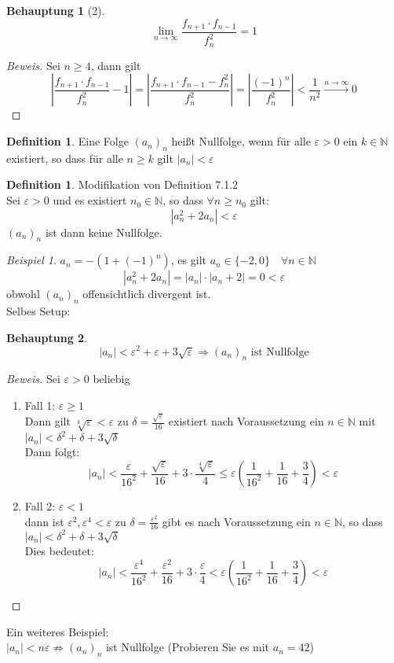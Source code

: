\documentclass[12pt,a4paper,titlepage]{article} %
\theoremstyle{definition}
\newtheorem{defi}[satz]{Definition}
\newtheorem*{beh}{Behauptung}
\theoremstyle{remark}
\newtheorem*{bsp}{Beispiel}
\newenvironment{bew}{\begin{proof}[Beweis]}{\end{proof}}
\newcommand{\N}{\mathbb{N}}
\newcommand{\limes}[1]{\lim\limits_{#1\rightarrow\infty}}
\begin{document}
	\begin{beh}[2]
		\[\limes{n} \frac{f_{n+1} \cdot f_{n-1}}{f_n^2} = 1\]
	\end{beh}
	\begin{bew}
		Sei \(n \geq 4\), dann gilt
		\[\left|\frac{f_{n+1} \cdot f_{n-1}}{f_n^2} - 1\right| = \left|\frac{f_{n+1} \cdot f_{n-1} - f_n^2}{f_n^2}\right| = \left|\frac{(-1)^n}{f_n^2}\right| < \frac{1}{n^2} \overset{n \rightarrow \infty}{\rightarrow} 0\]
	\end{bew}
	\begin{defi}
		Eine Folge \((a_n)_n\) heißt Nullfolge, wenn für alle \(\varepsilon > 0\) ein \(k \in \N\) existiert, so dass für alle \(n \geq k\) gilt \(|a_n| < \varepsilon\)
	\end{defi}
	\begin{defi}
		Modifikation von Definition 7.1.2\\
		Sei \(\varepsilon > 0\) und es existiert \(n_0 \in \N\), so dass \(\forall n \geq n_0\) gilt:
		\[|a_n^2 + 2a_n| < \varepsilon\]
		\((a_n)_n\) ist dann keine Nullfolge.
	\end{defi}
	\begin{bsp}
		\(a_n = -(1 + (-1)^n)\), es gilt \(a_n \in \{-2, 0\} \quad \forall n \in \N\)
		\[|a_n^2 + 2a_n| = |a_n| \cdot |a_n + 2| = 0 < \varepsilon\]
		obwohl \((a_n)_n\) offensichtlich divergent ist.\\
		Selbes Setup:
		\begin{beh}
			\[|a_n| < \varepsilon^2 + \varepsilon + 3\sqrt{\varepsilon} \Rightarrow (a_n)_n \text{ ist Nullfolge}\]
		\end{beh}
		\begin{bew}
			Sei \(\varepsilon > 0\) beliebig\\
			\begin{enumerate}
				\item Fall 1: \(\varepsilon \geq 1\)\\
					Dann gilt \(\sqrt[k]{\varepsilon} < \varepsilon\) zu \(\delta = \frac{\sqrt{\varepsilon}}{16}\) existiert nach Voraussetzung ein \(n \in \N\) mit \(|a_n| < \delta^2 + \delta + 3\sqrt{\delta}\)\\
					Dann folgt:
					\[|a_n| < \frac{\varepsilon}{16^2} + \frac{\sqrt{\varepsilon}}{16} + 3 \cdot \frac{\sqrt[4]{\varepsilon}}{4} \leq \varepsilon\left(\frac{1}{16^2} + \frac{1}{16} + \frac{3}{4}\right) < \varepsilon\]
				\item Fall 2: \(\varepsilon < 1\)\\
					dann ist \(\varepsilon^2, \varepsilon^4 < \varepsilon\) zu \(\delta = \frac{\varepsilon^2}{16}\) gibt es nach Voraussetzung ein \(n \in \N\), so dass \(|a_n| < \delta^2 + \delta + 3\sqrt{\delta}\)\\
					Dies bedeutet:
					\[|a_n| < \frac{\varepsilon^4}{16^2} + \frac{\varepsilon^2}{16} + 3 \cdot \frac{\varepsilon}{4} < \varepsilon\left(\frac{1}{16^2} + \frac{1}{16} + \frac{3}{4}\right) < \varepsilon\]
			\end{enumerate}
		\end{bew}
		Ein weiteres Beispiel:\\
		\(|a_n| < n\varepsilon \not \Rightarrow (a_n)_n\) ist Nullfolge (Probieren Sie es mit \(a_n = 42\))
	\end{bsp}
\end{document}
